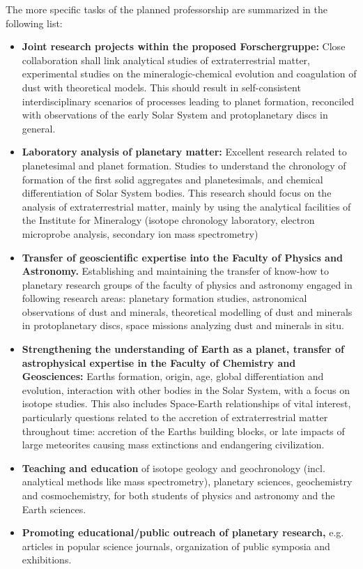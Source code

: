\medskip
\noindent 
The more specific tasks of the planned professorship are summarized in the following
list:
%
\begin{itemize}
\item {\bf
Joint research projects within the proposed Forschergruppe: 
}
Close collaboration shall link analytical studies of extraterrestrial matter,
experimental studies on the mineralogic-chemical evolution and coagulation of
dust with theoretical models. This should result in self-consistent
interdisciplinary scenarios of processes leading to planet formation,
reconciled with observations of the early Solar System and protoplanetary discs in general. 
%
\item {\bf
Laboratory analysis of planetary matter:
}
Excellent research related to planetesimal and planet formation.
Studies to understand the chronology of formation of the first solid aggregates
and planetesimals, and chemical differentiation of Solar System bodies.
This research should focus on the analysis of extraterrestrial matter, mainly
by using the analytical facilities of the Institute for Mineralogy 
(isotope chronology laboratory, electron microprobe analysis, secondary ion
mass spectrometry)
%
\item {\bf
Transfer of geoscientific expertise into the Faculty of Physics and Astronomy.
}
Establishing and maintaining the transfer of know-how to planetary research groups
of the faculty of physics and astronomy engaged in following research areas:
planetary formation studies, astronomical observations of dust and minerals, 
theoretical modelling of dust and
minerals in protoplanetary discs, space missions analyzing dust and minerals in situ.
%
\item {\bf
Strengthening the understanding of Earth as a planet, transfer of
astrophysical expertise in the Faculty of Chemistry and
Geosciences:
}
Earths formation, origin, age, global differentiation and evolution, interaction with
other bodies in the Solar System, with a focus on isotope studies.
This also includes Space-Earth relationships of vital interest,
particularly questions related to the accretion of extraterrestrial matter throughout
time: accretion of the Earths building blocks, or late impacts of large
meteorites causing mass extinctions and endangering civilization. 
%
\item {\bf
Teaching and education 
}
of isotope geology and geochronology (incl. analytical methods like mass spectrometry),
planetary sciences, geochemistry and cosmochemistry, for both students of physics
and astronomy and the Earth sciences.
%
\item {\bf
Promoting educational/public outreach of planetary research,
}
e.g. articles in popular science journals, organization of public symposia and exhibitions.
\end{itemize}
%
%
